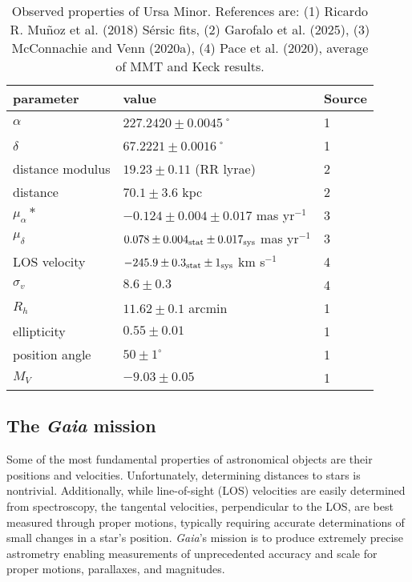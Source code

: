 \begin{table*}[t]
\centering
\caption[Observed Properties of Ursa Minor]{Observed properties of Ursa Minor. References are: (1) Ricardo R. Muñoz et al. (2018) Sérsic fits, (2) Garofalo et al. (2025), (3) McConnachie and Venn (2020a), (4) Pace et al. (2020), average of MMT and Keck results. }
\label{tbl:umi_obs_props}
\begin{tabular}{lll}
\toprule
parameter & value & Source\\
\midrule
$\alpha$ & $ 227.2420 \pm 0.0045$˚ & 1\\
$\delta$ & $67.2221 \pm 0.0016$˚ & 1\\
distance modulus & $19.23 \pm 0.11$ (RR lyrae) & 2\\
distance & $70.1 \pm 3.6$ kpc & 2\\
$\mu_\alpha*$ & $-0.124 \pm 0.004 \pm 0.017$ mas yr$^{-1}$ & 3\\
$\mu_\delta$ & $0.078 \pm 0.004_{\rm stat} \pm 0.017_{\rm sys}$ mas yr$^{-1}$ & 3\\
LOS velocity & $-245.9 \pm 0.3_{\rm stat} \pm 1_{\rm sys}$ km s$^{-1}$ & 4\\
$\sigma_v$ & $8.6 \pm 0.3$ & 4\\
$R_h$ & $11.62 \pm 0.1$ arcmin & 1\\
ellipticity & $0.55 \pm 0.01$ & 1\\
position angle & $50 \pm 1^\circ$ & 1\\
$M_V$ & $-9.03 \pm 0.05$ & 1\\
\bottomrule
\end{tabular}
\end{table*}

\subsection{\texorpdfstring{The \emph{Gaia}
mission}{The Gaia mission}}\label{the-gaia-mission}

Some of the most fundamental properties of astronomical objects are
their positions and velocities. Unfortunately, determining distances to
stars is nontrivial. Additionally, while line-of-sight (LOS) velocities
are easily determined from spectroscopy, the tangental velocities,
perpendicular to the LOS, are best measured through proper motions,
typically requiring accurate determinations of small changes in a star's
position. \emph{Gaia}'s mission is to produce extremely precise
astrometry enabling measurements of unprecedented accuracy and scale for
proper motions, parallaxes, and magnitudes.

